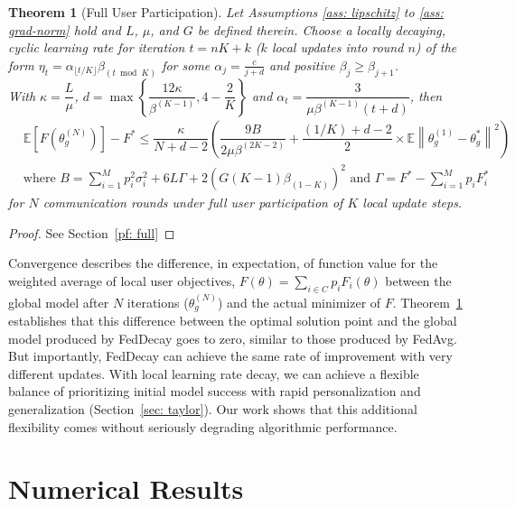 \documentclass{article}
\newtheorem{theorem}{Theorem}
\newcommand\norm[1]{\left\lVert#1\right\rVert}
\begin{document}
\begin{theorem}[Full User Participation]
\label{thm: full}
    Let Assumptions \ref{ass: lipschitz} to \ref{ass: grad-norm} hold and $L$, $\mu$, and $G$ be defined therein. Choose a locally decaying, cyclic learning rate for iteration $t = nK + k$ ($k$ local updates into round $n$) of the form $\eta_t = \alpha_{\lfloor t/K \rfloor} \beta_{(t \bmod K)}$ for some $\alpha_j = \frac{c}{j + d}$ and positive $\beta_j \geq \beta_{j + 1}$. \\
    With ${\kappa = \dfrac{L}{\mu}}$, ${d = \max \left\{ \dfrac{12 \kappa}{\beta^{(K - 1)}}, 4 - \dfrac{2}{K} \right\}}$ and ${\alpha_t = \dfrac{3}{\mu \beta^{(K - 1)} (t + d)}}$, then
    \begin{align*}
        & \mathbb{E} \left[ F ( \theta_g^{(N)} ) \right] - F^* \leq \dfrac{\kappa}{N + d - 2} \left( \dfrac{9B}{2 \mu \beta^{(2K - 2)}} + \dfrac{(1/K) + d - 2}{2} \times \mathbb{E} \norm{\theta_g^{(1)} - \theta_g^*}^2 \right) \\
        & \textrm{where } B = \sum_{i = 1}^M p_i^2 \sigma_i^2 + 6 L \Gamma + 2 \left( G (K - 1) \beta_{(1 - K)} \right)^2 \textrm{ and } \Gamma = F^* - \sum_{i = 1}^M p_i F_i^*
    \end{align*}
    for $N$ communication rounds under full user participation of $K$ local update steps.
\end{theorem}
\begin{proof}
    \renewcommand{\qedsymbol}{}
    See Section~\ref{pf: full}
\end{proof}

Convergence describes the difference, in expectation, of function value for the weighted average of local user objectives, $F(\theta) = \sum_{i \in C} p_i F_i(\theta)$ between the global model after $N$ iterations ($\theta_g^{(N)}$) and the actual minimizer of $F$. 
Theorem~\ref{thm: full} establishes that this difference between the optimal solution point and the global model produced by FedDecay goes to zero, similar to those produced by FedAvg.
But importantly, FedDecay can achieve the same rate of improvement with very different updates. 
With local learning rate decay, we can achieve a flexible balance of prioritizing initial model success with rapid personalization and generalization (Section~\ref{sec: taylor}).
Our work shows that this additional flexibility comes without seriously degrading algorithmic performance. 


%
\section{Numerical Results}\
\end{document}
